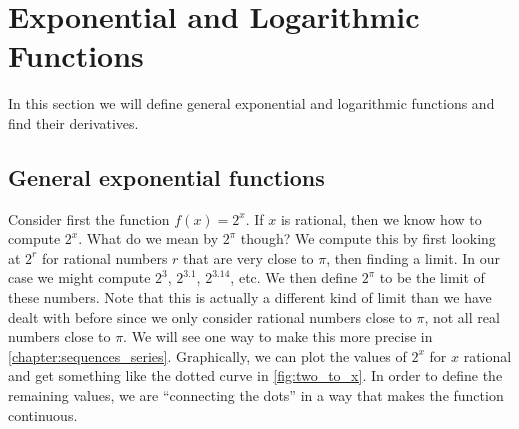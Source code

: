 \section{Exponential and Logarithmic Functions}\label{sec:exp_log}

In this section we will define general exponential and logarithmic functions and find their derivatives. 

\subsection{General exponential functions}

Consider first the function $f(x)=2^x$. If $x$ is rational, then we know how to compute $2^x$. What do we mean by $2^\pi$ though? We compute this by first looking at $2^r$ for rational numbers $r$ that are very close to $\pi$, then finding a limit. In our case we might compute $2^3$, $2^{3.1}$, $2^{3.14}$, etc. We then define $2^\pi$ to be the limit of these numbers. Note that this is actually a different kind of limit than we have dealt with before since we only consider rational numbers close to $\pi$, not all real numbers close to $\pi$. We will see one way to make this more precise in \autoref{chapter:sequences_series}. Graphically, we can plot the values of $2^x$ for $x$ rational and get something like the dotted curve in \autoref{fig:two_to_x}. In order to define the remaining values, we are ``connecting the dots'' in a way that makes the function continuous.

